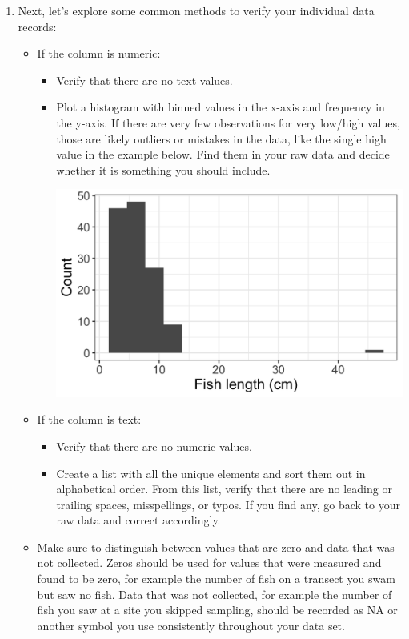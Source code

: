 \documentclass[
]{book}
\begin{document}
\begin{enumerate}
\def\labelenumi{\arabic{enumi}.}
\setcounter{enumi}{2}
\item
  Next, let's explore some common methods to verify your individual data records:

  \begin{itemize}
  \item
    If the column is numeric:

    \begin{itemize}
    \item
      Verify that there are no text values.
    \item
      Plot a histogram with binned values in the x-axis and frequency in the y-axis. If there are very few observations for very low/high values, those are likely outliers or mistakes in the data, like the single high value in the example below. Find them in your raw data and decide whether it is something you should include.

      \includegraphics{images/M2S2_image3_data_cleaning_histogram.png}
    \end{itemize}
  \item
    If the column is text:

    \begin{itemize}
    \item
      Verify that there are no numeric values.
    \item
      Create a list with all the unique elements and sort them out in alphabetical order. From this list, verify that there are no leading or trailing spaces, misspellings, or typos. If you find any, go back to your raw data and correct accordingly.
    \end{itemize}
  \item
    Make sure to distinguish between values that are zero and data that was not collected. Zeros should be used for values that were measured and found to be zero, for example the number of fish on a transect you swam but saw no fish. Data that was not collected, for example the number of fish you saw at a site you skipped sampling, should be recorded as NA or another symbol you use consistently throughout your data set.
  \end{itemize}
\end{enumerate}
\end{document}
